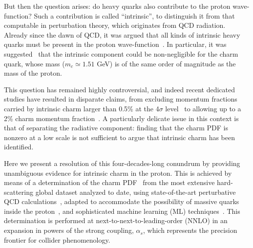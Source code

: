 But then the question arises: do heavy quarks also contribute to the
proton wave-function? Such a contribution is called ``intrinsic'', to
distinguish it from that computable in
perturbation theory, which originates from QCD radiation.
%
Already since the dawn of QCD, it
was argued that all kinds of intrinsic heavy quarks must be
present in the
proton wave-function~\cite{Brodsky:1984nx}.
%
In particular, it was
suggested~\cite{Brodsky:1980pb}
that the intrinsic component could be non-negligible for the
charm quark, whose mass ($m_c\simeq 1.51$ GeV) is of the same order of
magnitude as the mass of the proton.

This question has remained highly controversial, and indeed recent
dedicated studies have resulted in disparate claims,
from excluding momentum fractions carried by intrinsic  charm larger than 0.5\% at the 4$\sigma$
level~\cite{Jimenez-Delgado:2014zga} to allowing up to a 2\% charm momentum
fraction~\cite{Hou:2017khm}.
%
A particularly delicate issue in this context is that of
separating the radiative component: finding that the charm PDF
is nonzero at a low scale is not sufficient to argue that intrinsic charm
has been identified.

Here we present a resolution of this four-decades-long conundrum
by providing unambiguous evidence for intrinsic charm  in the proton.
%
This is achieved by means of a determination of the charm
PDF~\cite{Ball:2021leu} from the most extensive hard-scattering 
global dataset analyzed to date, using state-of-the-art perturbative
QCD calculations~\cite{Heinrich:2020ybq}, adapted to accommodate the possibility of massive quarks inside the proton~\cite{Forte:2010ta,Ball:2015dpa,Ball:2015tna}, and sophisticated machine 
learning (ML)
techniques~\cite{Ball:2016neh,Ball:2017nwa,Ball:2021leu}. This
determination is performed at next-to-next-to-leading-order (NNLO) in an
expansion in powers of the strong coupling, $\alpha_s$, which
represents the precision frontier for collider phenomenology.
%

